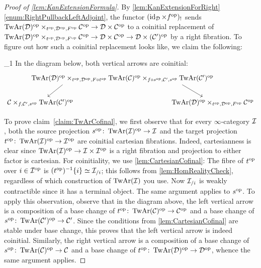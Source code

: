 \begin{proof}[Proof of \cref{lem:KanExtensionFormula}]
	By  \cref{lem:KanExtensionForRight}\cref{enum:RightPullbackLeftAdjoint}, the functor $(\operatorname{id}_{\mathcal{D}}\times f^{\mathrm{op}})_!$ sends $\operatorname{TwAr}(\mathcal{D})^{\mathrm{op}}\times_{t^{\mathrm{op}},\mathcal{D}^{\mathrm{op}},F^{\mathrm{op}}}\mathcal{C}^{\mathrm{op}}\rightarrow \mathcal{D}\times\mathcal{C}^{\mathrm{op}}$ to a coinitial replacement of $\operatorname{TwAr}(\mathcal{D})^{\mathrm{op}}\times_{t^{\mathrm{op}},\mathcal{D}^{\mathrm{op}},F^{\mathrm{op}}}\mathcal{C}^{\mathrm{op}}\rightarrow \mathcal{D}\times\mathcal{C}^{\mathrm{op}}\rightarrow \mathcal{D}\times(\mathcal{C}')^{\mathrm{op}}$ by a right fibration. To figure out how such a coinitial replacement looks like, we claim the following:
	\begin{alphanumerate}\itshape
		\item[\boxtimes_1] In the diagram below, both vertical arrows are coinitial:\label{claim:TwArCofinal}
		\begin{equation*}
			\begin{tikzcd}[column sep=-7em]
				& \TwAr(\Dd)^\op\times_{t^\op,\Dd^\op,F\circ t^\op}\TwAr(\Cc)^\op\times_{f\circ s^\op,\Cc',s^\op}\TwAr(\Cc')^\op\dlar[start anchor=186]\drar[start anchor=-6]& \\
				\Cc\times_{f,\Cc',s^\op}\TwAr(\Cc')^\op & & \TwAr(\Dd)^\op\times_{t^\op,\Dd^\op,F^\op}\Cc^\op
			\end{tikzcd}
		\end{equation*} 
	\end{alphanumerate}
	To prove claim~\cref{claim:TwArCofinal}, we first observe that for every $\infty$-category $\mathcal{I}$, both the source projection $s^{\mathrm{op}}\colon \operatorname{TwAr}(\mathcal{I})^{\mathrm{op}}\rightarrow \mathcal{I}$ and the target projection $t^{\mathrm{op}}\colon \operatorname{TwAr}(\mathcal{I})^{\mathrm{op}}\rightarrow \mathcal{I}^{\mathrm{op}}$ are coinitial cartesian fibrations. Indeed, cartesianness is clear since $\operatorname{TwAr}(\mathcal{I})^{\mathrm{op}}\rightarrow\mathcal{I}\times\mathcal{I}^{\mathrm{op}}$ is a right fibration and projection to either factor is cartesian. For coinitiality, we use \cref{lem:CartesianCofinal}: The fibre of $t^{\mathrm{op}}$ over $i\in \mathcal{I}^{\mathrm{op}}$ is $(t^{\mathrm{op}})^{-1}\{i\}\simeq \mathcal{I}_{/i}$; this follows from \cref{lem:HomRealityCheck}, regardless of which construction of $\operatorname{TwAr}(\mathcal{I})$ you use. Now $\mathcal{I}_{/i}$ is weakly contractible since it has a terminal object. The same argument applies to $s^{\mathrm{op}}$. To apply this observation, observe that in the diagram above, the left vertical arrow is a composition of a base change of $t^{\mathrm{op}}\colon \operatorname{TwAr}(\mathcal{C})^{\mathrm{op}}\rightarrow \mathcal{C}^{\mathrm{op}}$ and a base change of $s^{\mathrm{op}}\colon \operatorname{TwAr}(\mathcal{C}')^{\mathrm{op}}\rightarrow \mathcal{C}'$. Since the conditions from \cref{lem:CartesianCofinal} are stable under base change, this proves that the left vertical arrow is indeed coinitial. Similarly, the right vertical arrow is a composition of a base change of $s^{\mathrm{op}}\colon \operatorname{TwAr}(\mathcal{C})^{\mathrm{op}}\rightarrow \mathcal{C}$ and a base change of $t^{\mathrm{op}}\colon \operatorname{TwAr}(\mathcal{D})^{\mathrm{op}}\rightarrow \mathcal{D}^{\mathrm{op}}$, whence the same argument applies.
	

\end{proof}
